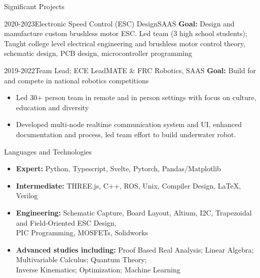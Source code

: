\documentclass[]{mcdowellcv}
\begin{document}
\newpage

\begin{cvsection}{Significant Projects}
	\begin{cvsubsection}{2020-2023}{Electronic Speed Control (ESC) Design}{SAAS}
		\textbf{Goal:} Design and manufacture custom brushless motor ESC. Led team (3 high school students); Taught college level electrical engineering and brushless motor control theory, schematic design, PCB design, microcontroller programming
	\end{cvsubsection}
	\begin{cvsubsection}{2019-2022}{Team Lead; ECE Lead}{MATE \& FRC Robotics, SAAS}
		\textbf{Goal:} Build for and compete in national robotics competitions
		\begin{itemize}
			\item Led 30+ person team in remote and in person settings with focus on culture, education and diversity
			\item Developed multi-node realtime communication system and UI, enhanced documentation and process, led team effort to build underwater robot.
		\end{itemize}
	\end{cvsubsection}
\end{cvsection}

\begin{cvsection}{Languages and Technologies}
	\begin{cvsubsection}{}{}{}
		\begin{itemize}
			\item \textbf{Expert:} Python, Typescript, Svelte, Pytorch, Pandas/Matplotlib
			\item \textbf{Intermediate:} THREE.js, C++, ROS, Unix, Compiler Design, LaTeX, Verilog
			\item \textbf{Engineering:} Schematic Capture, Board Layout, Altium, I2C,
			      Trapezoidal and Field-Oriented ESC Design, \\ PIC Programming, MOSFETs, Solidworks
			\item \textbf{Advanced studies including:} Proof Based Real Analysis; Linear Algebra; Multivariable Calculus; Quantum Theory; \\ Inverse Kinematics; Optimization; Machine Learning
		\end{itemize}
	\end{cvsubsection}
\end{cvsection}
\end{document}
